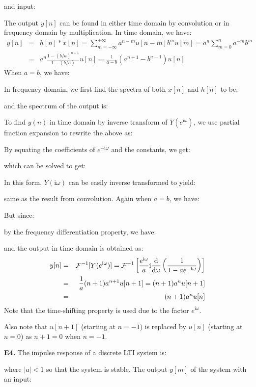 	and input:
	
	The output $y[n]$ can be found in either time domain by convolution or in frequency domain by multiplication. In time domain, we have:
	\begin{eqnarray}
	y[n] &=& h[n]*x[n]=\sum_{m=-\infty}^{+\infty} a^{n-m}u[n-m] b^m u[m]
		=a^n\sum_{m=0}^n a^{-m} b^m
		\nonumber \\
	 &=& a^n \frac{1-(b/a)^{n+1}}{1-(b/a)}u[n]=\frac{1}{a-b}(a^{n+1}-b^{n+1})u[n]
		\nonumber 
	\end{eqnarray}
	When $a=b$, we have:
	
	In frequency domain, we first find the spectra of both $x[n]$ and $h[n]$ to be:
	
	and the spectrum of the output is:
	
	To find $y(n)$ in time domain by inverse transform of $Y(e^{\mathrm{i}\omega})$, we use partial fraction expansion to rewrite the above as:
	
	By equating the coefficients of $e^{-\mathrm{i}\omega}$ and the constants, we get:
	
	which can be solved to get:
	
	In this form, $Y(\mathrm{i}\omega)$ can be easily inverse transformed to yield:
	
	same as the result from convolution. Again when $a=b$, we have:
	
	But since:
	
	by the frequency differentiation property, we have:
	
	and the output in time domain is obtained as:
	\begin{eqnarray}
	y[n]&=&{\cal F}^{-1}[Y(e^{\mathrm{i}\omega})]
	={\cal F}^{-1}\left[\frac{e^{\mathrm{i}\omega}}{a}\mathrm{i}\frac{\mathrm{d}}{\mathrm{d}\omega}\left(\frac{1}{1-ae^{-\mathrm{i}\omega}}\right)\right]
		\nonumber \\
	 &=& \frac{1}{a} (n+1)a^{n+1} u[n+1]=(n+1)a^n u[n+1]
		\nonumber \\
	 &=& (n+1)a^n u[n]	
		\nonumber
	\end{eqnarray}
	Note that the time-shifting property is used due to the factor $e^{\mathrm{i}\omega}$.
	
	Also note that $u[n+1]$ (starting at $n=-1$) is replaced by $u[n]$ (starting at $n=0$) as $n+1=0$ when $n=-1$.
	
	{\bf E4.} The impulse response of a discrete LTI system is:
	
	where $|a|<1$ so that the system is stable. The output $y[m]$ of the system with an input:
	
